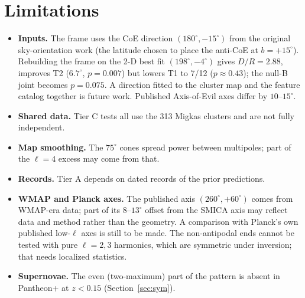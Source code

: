 \documentclass[11pt,a4paper]{article}
\newcommand{\dg}{^\circ}
\begin{document}
\section{Limitations}
\begin{itemize}\setlength\itemsep{1pt}
\item \textbf{Inputs.} The frame uses the CoE direction $(180\dg,-15\dg)$ from the original sky-orientation work (the latitude chosen to place the anti-CoE at $b=+15\dg$). Rebuilding the frame on the 2-D best fit $(198\dg,-4\dg)$ gives $D/R=2.88$, improves T2 ($6.7\dg$, $p=0.007$) but lowers T1 to 7/12 ($p\approx0.43$); the null-B joint becomes $p=0.075$. A direction fitted to the cluster map and the feature catalog together is future work. Published Axis-of-Evil axes differ by $10$--$15\dg$.
\item \textbf{Shared data.} Tier C tests all use the 313 Migkas clusters and are not fully independent.
\item \textbf{Map smoothing.} The $75\dg$ cones spread power between multipoles; part of the $\ell=4$ excess may come from that.
\item \textbf{Records.} Tier A depends on dated records of the prior predictions.
\item \textbf{WMAP and Planck axes.} The published axis $(260\dg,+60\dg)$ comes from WMAP-era data; part of its $8$--$13\dg$ offset from the SMICA axis may reflect data and method rather than the geometry. A comparison with Planck's own published low-$\ell$ axes is still to be made. The non-antipodal ends cannot be tested with pure $\ell=2,3$ harmonics, which are symmetric under inversion; that needs localized statistics.
\item \textbf{Supernovae.} The even (two-maximum) part of the pattern is absent in Pantheon+ at $z<0.15$ (Section~\ref{sec:sym}).
\end{itemize}
\end{document}
